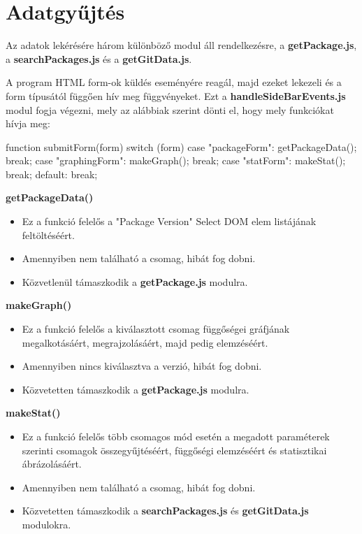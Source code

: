 \pagebreak

\section{Adatgyűjtés}

Az adatok lekérésére három különböző modul áll rendelkezésre, a \textbf{getPackage.js}, a \textbf{searchPackages.js} és a \textbf{getGitData.js}.

A program HTML form-ok küldés eseményére reagál, majd ezeket lekezeli és a form típusától függően hív meg függvényeket. Ezt a \textbf{handleSideBarEvents.js} modul fogja végezni, mely az alábbiak szerint dönti el, hogy mely funkciókat hívja meg:

\begin{cpp}
function submitForm(form){
	switch (form) {
		case "packageForm":
		getPackageData();
		break;
		case "graphingForm":
		makeGraph();
		break;
		case "statForm":
		makeStat();
		break;
		default:
		break;
	}
}
\end{cpp}

\noindent\textbf{getPackageData()}
\begin{itemize}
	\item Ez a funkció felelős a "Package Version" Select DOM elem listájának feltöltéséért. 
	\item Amennyiben nem található a csomag, hibát fog dobni.
	\item Közvetlenül támaszkodik a \textbf{getPackage.js} modulra.
\end{itemize}

\noindent\textbf{makeGraph()}
\begin{itemize}
	\item Ez a funkció felelős a kiválasztott csomag függőségei gráfjának megalkotásáért, megrajzolásáért, majd pedig elemzéséért.
	\item Amennyiben nincs kiválasztva a verzió, hibát fog dobni.
	\item Közvetetten támaszkodik a \textbf{getPackage.js} modulra.
\end{itemize}

\noindent\textbf{makeStat()}
\begin{itemize}
	\item Ez a funkció felelős több csomagos mód esetén a megadott paraméterek szerinti csomagok összegyűjtéséért, függőségi elemzéséért és statisztikai ábrázolásáért.
	\item Amennyiben nem található a csomag, hibát fog dobni.
	\item Közvetetten támaszkodik a \textbf{searchPackages.js} és \textbf{getGitData.js} modulokra.
\end{itemize}

